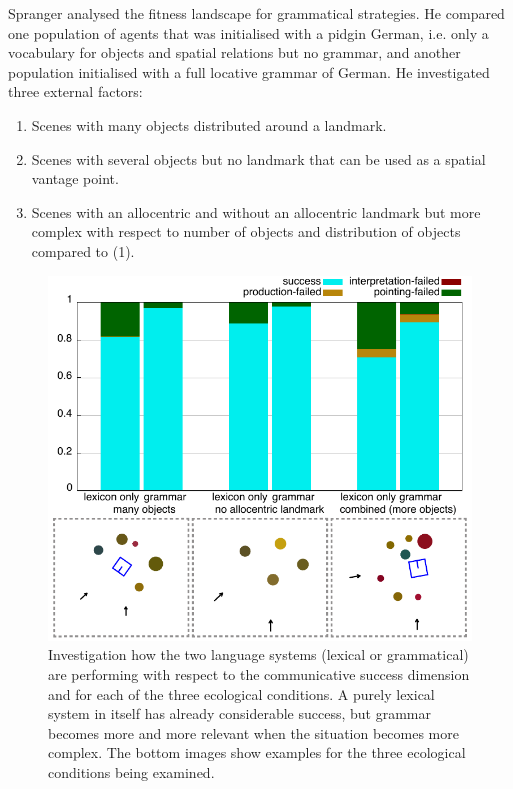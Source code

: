 Spranger analysed the fitness landscape for grammatical strategies. He compared 
one population of agents that was initialised with a pidgin German, i.e. only a vocabulary for objects and spatial relations 
but no grammar, and another population initialised with a full locative grammar of German. He investigated three external 
factors: \clearpage
\begin{enumerate}
\item Scenes with many objects distributed around a landmark.
\item Scenes with several objects but no landmark that can be used as a spatial vantage point. 
\item Scenes with an allocentric and without an allocentric landmark but more complex with respect to number 
of objects and distribution of objects compared to (1). 
\end{enumerate}

\begin{figure}
\centerline{\includegraphics[width=0.5\linewidth]{chap12/figs/why-grammar-german.pdf}}
\caption{Investigation how the two language systems (lexical or grammatical) are performing with respect to the 
communicative success dimension and for each of the three ecological conditions. A purely lexical system in itself has 
already considerable success, but grammar becomes more and more relevant when the situation becomes more complex.
The bottom images show examples for the three ecological conditions being examined.}
\label{fig:why-grammar-german}
\end{figure}

